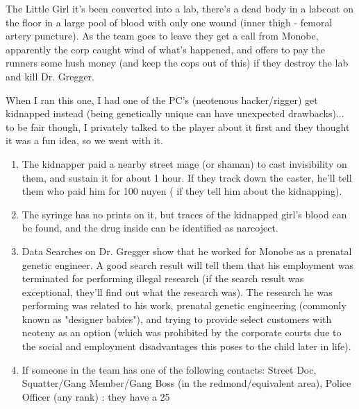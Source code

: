 \begin{scenario}{The Little Girl}
it's been converted into a lab, there's a dead body in a labcoat on the floor in a large pool of blood with only one wound (inner thigh - femoral artery puncture). As the team goes to leave they get a call from Monobe, apparently the corp caught wind of what's happened, and offers to pay the runners some hush money (and keep the cops out of this) if they destroy the lab and kill Dr. Gregger.

\notes When I ran this one, I had one of the PC's (neotenous hacker/rigger) get kidnapped instead (being genetically unique can have unexpected drawbacks)... to be fair though, I privately talked to the player about it first and they thought it was a fun idea, so we went with it.

\begin{enumerate}

\item The kidnapper paid a nearby street mage (or shaman) to cast invisibility on them, and sustain it for about 1 hour. If they track down the caster, he'll tell them who paid him for 100 nuyen ( if they tell him about the kidnapping).

\item The syringe has no prints on it, but traces of the kidnapped girl's blood can be found, and the drug inside can be identified as narcoject.

\item Data Searches on Dr. Gregger show that he worked for Monobe as a prenatal genetic engineer. A good search result will tell them that his employment was terminated for performing illegal research (if the search result was exceptional, they'll find out what the research was). The research he was performing was related to his work, prenatal genetic engineering (commonly known as "designer babies"), and trying to provide select customers with neoteny as an option (which was prohibited by the corporate courts due to the social and employment disadvantages this poses to the child later in life).

\item If someone in the team has one of the following contacts: Street Doc, Squatter/Gang Member/Gang Boss (in the redmond/equivalent area), Police Officer (any rank) : they have a 25%


\end{enumerate}
\end{scenario}
